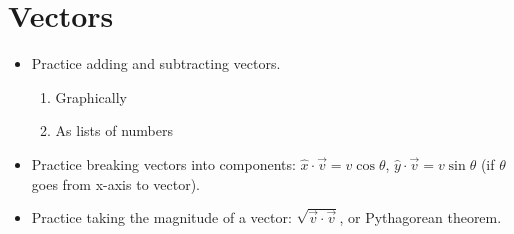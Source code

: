 \documentclass[10pt]{article}
\begin{document}
\section{Vectors}
\begin{itemize}
\item Practice adding and subtracting vectors.
\begin{enumerate}
\item Graphically
\item As lists of numbers
\end{enumerate}
\item Practice breaking vectors into components: $\hat{x} \cdot \vec{v} = v\cos\theta$, $\hat{y} \cdot \vec{v}=v\sin\theta$ (if $\theta$ goes from x-axis to vector).
\item Practice taking the magnitude of a vector: $\sqrt{\vec{v}\cdot\vec{v}}$, or Pythagorean theorem.
\end{itemize}
\end{document}
